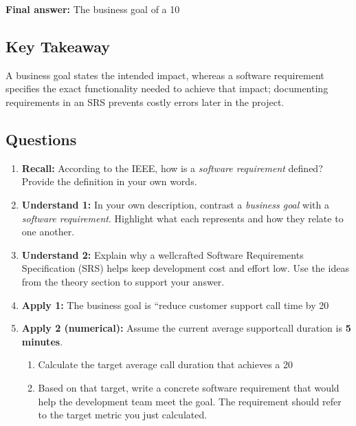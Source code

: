 \documentclass[12pt, a4paper]{article}
\begin{document}
\textbf{Final answer:} The business goal of a 10 %

\subsection{Key Takeaway}
A business goal states the intended impact, whereas a software requirement specifies the exact functionality needed to achieve that impact; documenting requirements in an SRS prevents costly errors later in the project.

\subsection{Questions}
\begin{enumerate}
    \item \textbf{Recall:} According to the IEEE, how is a \emph{software requirement} defined?  Provide the definition in your own words. \newpage
    
    \item \textbf{Understand 1:} In your own description, contrast a \emph{business goal} with a \emph{software requirement}. Highlight what each represents and how they relate to one another. \newpage
    
    \item \textbf{Understand 2:} Explain why a wellcrafted Software Requirements Specification (SRS) helps keep development cost and effort low. Use the ideas from the theory section to support your answer. \newpage
    
    \item \textbf{Apply 1:} The business goal is ``reduce customer support call time by 20 %
    
    \item \textbf{Apply 2 (numerical):} Assume the current average supportcall duration is \textbf{5 minutes}.
        \begin{enumerate}
            \item Calculate the target average call duration that achieves a 20 %
            \item Based on that target, write a concrete software requirement that would help the development team meet the goal. The requirement should refer to the target metric you just calculated.
        \end{enumerate} \newpage
    

\end{enumerate}
\end{document}
